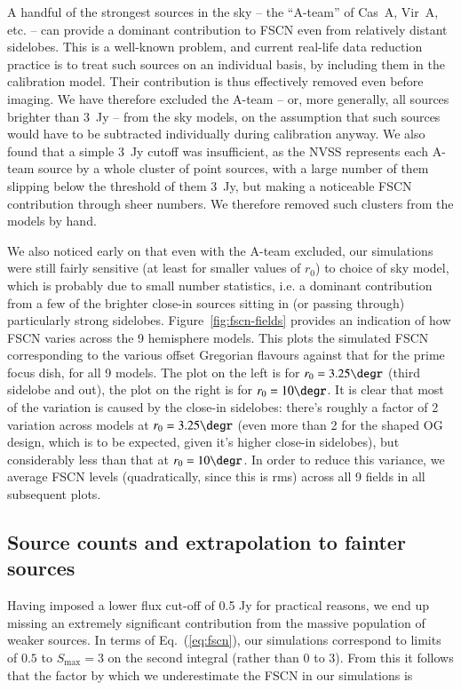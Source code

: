 \documentclass{aa}
\begin{document}
A handful of the strongest sources in the sky -- the ``A-team'' of  Cas~A, Vir~A, etc. -- can provide a dominant contribution to FSCN even from relatively distant sidelobes. This is a well-known problem, and current real-life data reduction practice is to treat such sources on an individual basis, by including them in the calibration model. Their contribution is thus effectively removed even before imaging. We have therefore excluded the A-team -- or, more generally, all sources brighter than 3~Jy -- from the sky models, on the assumption that such sources would have to be subtracted individually during calibration anyway. We also found that a simple 3~Jy cutoff was insufficient, as the NVSS represents each A-team source by a whole cluster of point sources, with a large number of them slipping below the threshold of them 3~Jy, but making a noticeable FSCN contribution through sheer numbers. We therefore removed such clusters from the models by hand.

We also noticed early on that even with the A-team excluded, our simulations were still fairly sensitive (at least for smaller values of $r_0$) to choice of sky model, which is probably due to small number statistics, i.e. a dominant contribution from a few of the brighter close-in sources sitting in (or passing through) particularly strong sidelobes. Figure~\ref{fig:fscn-fields} provides an indication of how FSCN varies across the 9 hemisphere models. This plots the simulated FSCN corresponding to the various offset Gregorian flavours against that for the prime focus dish, for all 9 models. The plot on the left is for $r_0=3.25\degr$ (third sidelobe and out), the plot on the right is for $r_0=10\degr$. It is clear that most of the variation is caused by the close-in sidelobes: there's roughly a factor of 2 variation across models at $r_0=3.25\degr$ (even more than 2 for the shaped OG design, which is to be expected, given it's higher close-in sidelobes), but considerably less than that at $r_0=10\degr$. In order to reduce this variance, we average FSCN levels (quadratically, since this is rms) across all 9 fields in all subsequent plots.

\subsection{Source counts and extrapolation to fainter sources}
\label{sec:source-counts}
Having imposed a lower flux cut-off of 0.5 Jy for practical reasons, we end up missing an extremely significant contribution from the massive population of weaker sources. In terms of Eq.~(\ref{eq:fscn}), our simulations correspond to limits of $0.5$ to $S_\mathrm{max}=3$ on the second integral (rather than $0$ to $3$). From this it follows that the factor by which we underestimate the FSCN in our simulations is
\end{document}
